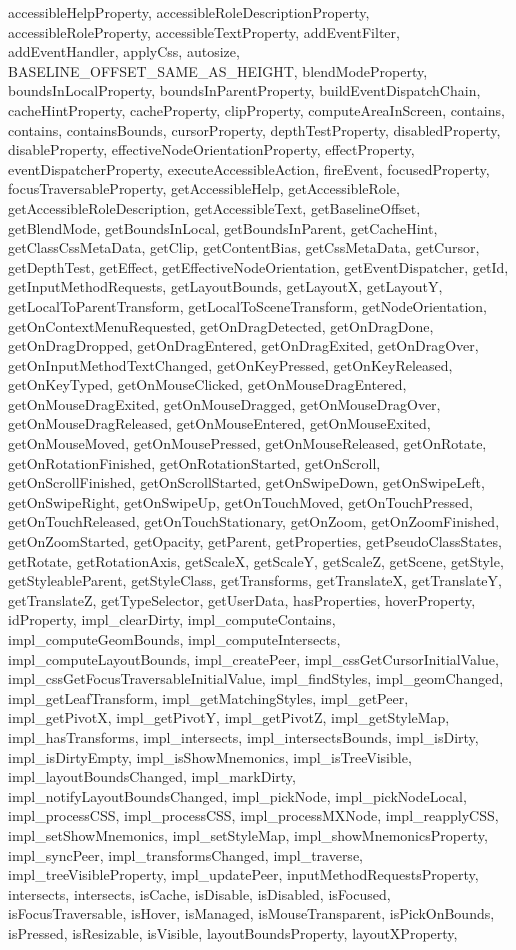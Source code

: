 {{{{{{{{{{{{{{{{{{{{{{{{{{{{{{{{{{{{{{{{{{{{{{{{{{{{{{{{{{{{{{{{{{{{{{{{{{{{accessibleHelpProperty, accessibleRoleDescriptionProperty, accessibleRoleProperty, accessibleTextProperty, addEventFilter, addEventHandler, applyCss, autosize, BASELINE\_OFFSET\_SAME\_AS\_HEIGHT, blendModeProperty, boundsInLocalProperty, boundsInParentProperty, buildEventDispatchChain, cacheHintProperty, cacheProperty, clipProperty, computeAreaInScreen, contains, contains, containsBounds, cursorProperty, depthTestProperty, disabledProperty, disableProperty, effectiveNodeOrientationProperty, effectProperty, eventDispatcherProperty, executeAccessibleAction, fireEvent, focusedProperty, focusTraversableProperty, getAccessibleHelp, getAccessibleRole, getAccessibleRoleDescription, getAccessibleText, getBaselineOffset, getBlendMode, getBoundsInLocal, getBoundsInParent, getCacheHint, getClassCssMetaData, getClip, getContentBias, getCssMetaData, getCursor, getDepthTest, getEffect, getEffectiveNodeOrientation, getEventDispatcher, getId, getInputMethodRequests, getLayoutBounds, getLayoutX, getLayoutY, getLocalToParentTransform, getLocalToSceneTransform, getNodeOrientation, getOnContextMenuRequested, getOnDragDetected, getOnDragDone, getOnDragDropped, getOnDragEntered, getOnDragExited, getOnDragOver, getOnInputMethodTextChanged, getOnKeyPressed, getOnKeyReleased, getOnKeyTyped, getOnMouseClicked, getOnMouseDragEntered, getOnMouseDragExited, getOnMouseDragged, getOnMouseDragOver, getOnMouseDragReleased, getOnMouseEntered, getOnMouseExited, getOnMouseMoved, getOnMousePressed, getOnMouseReleased, getOnRotate, getOnRotationFinished, getOnRotationStarted, getOnScroll, getOnScrollFinished, getOnScrollStarted, getOnSwipeDown, getOnSwipeLeft, getOnSwipeRight, getOnSwipeUp, getOnTouchMoved, getOnTouchPressed, getOnTouchReleased, getOnTouchStationary, getOnZoom, getOnZoomFinished, getOnZoomStarted, getOpacity, getParent, getProperties, getPseudoClassStates, getRotate, getRotationAxis, getScaleX, getScaleY, getScaleZ, getScene, getStyle, getStyleableParent, getStyleClass, getTransforms, getTranslateX, getTranslateY, getTranslateZ, getTypeSelector, getUserData, hasProperties, hoverProperty, idProperty, impl\_clearDirty, impl\_computeContains, impl\_computeGeomBounds, impl\_computeIntersects, impl\_computeLayoutBounds, impl\_createPeer, impl\_cssGetCursorInitialValue, impl\_cssGetFocusTraversableInitialValue, impl\_findStyles, impl\_geomChanged, impl\_getLeafTransform, impl\_getMatchingStyles, impl\_getPeer, impl\_getPivotX, impl\_getPivotY, impl\_getPivotZ, impl\_getStyleMap, impl\_hasTransforms, impl\_intersects, impl\_intersectsBounds, impl\_isDirty, impl\_isDirtyEmpty, impl\_isShowMnemonics, impl\_isTreeVisible, impl\_layoutBoundsChanged, impl\_markDirty, impl\_notifyLayoutBoundsChanged, impl\_pickNode, impl\_pickNodeLocal, impl\_processCSS, impl\_processCSS, impl\_processMXNode, impl\_reapplyCSS, impl\_setShowMnemonics, impl\_setStyleMap, impl\_showMnemonicsProperty, impl\_syncPeer, impl\_transformsChanged, impl\_traverse, impl\_treeVisibleProperty, impl\_updatePeer, inputMethodRequestsProperty, intersects, intersects, isCache, isDisable, isDisabled, isFocused, isFocusTraversable, isHover, isManaged, isMouseTransparent, isPickOnBounds, isPressed, isResizable, isVisible, layoutBoundsProperty, layoutXProperty, }}}}}}}}}}}}}}}}}}}}}}}}}}}}}}}}}}}}}}}}}}}}}}}}}}}}}}}}}}}}}}}}}}}}}}}}}}}}

